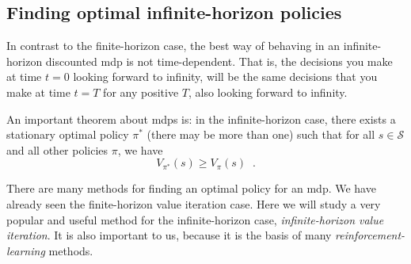 \subsection{Finding optimal infinite-horizon policies}
\label{sec-mdp_infinite_horizon_optimal}

In contrast to the finite-horizon case, the best way of behaving in an
infinite-horizon discounted {\sc mdp} is not time-dependent. That is,
the decisions you make at time $t = 0$ looking forward to infinity,
will be the same decisions that you make at time $t = T$ for any positive
$T$, also looking forward to infinity.

An important theorem about {\sc mdp}s is: in the infinite-horizon
case, there exists a stationary
 optimal policy $\pi^*$ (there may be more than
one) such that for all $s \in \mathcal S$ and all other policies
$\pi$, we have
\begin{equation}
  V_{\pi^*}(s) \ge V_{\pi}(s) \;\;.
\end{equation}


There are many methods for finding an optimal policy for an {\sc mdp}.
We have already seen the finite-horizon value iteration case.  Here we
will study a very popular and useful method for the infinite-horizon
case, {\em infinite-horizon value iteration}.  It is also important to
us, because it is the basis of many {\em reinforcement-learning} methods.

